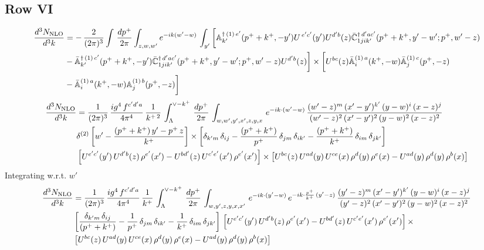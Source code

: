 \documentclass[9pt]{article}
\def\mf#1{\mathbb{#1}}
\numberwithin{equation}{section}
\begin{document}
\subsection{Row VI\,}
\begin{align}
     \frac{d^{3}N_{\rm NLO}}{d^{3}k} & =  -\, \frac{2}{(2\pi)^{3}} \int\, \frac{dp^{+}}{2\pi}\int_{z,w,w^{\prime}} e^{-ik(w^{\prime}-w)}\, \int_{y^{\prime}}\bigg[\mf{A}^{\dagger\, (1)\,e^{\prime}}_{k^{\prime}}(p^{+}+k^{+},-y^{\prime})U^{\, e^{\prime}c^{\prime}}(y^{\prime})U^{d^{\prime}b}(z) \Bar{\mf{C}}^{\dagger\, d^{\prime}ac^{\prime}}_{1jik^{\prime}}(p^{+}+k^{+},y^{\prime}-w^{\prime}; p^{+},w^{\prime}-z) \notag \\ & -\Bar{\mf{A}}^{\dagger\, (1)\,c^{\prime}}_{k^{\prime}}(p^{+}+k^{+},-y^{\prime})\Bar{\mf{C}}^{\dagger\, d^{\prime}ac^{\prime}}_{1jik^{\prime}}(p^{+}+k^{+},y^{\prime}-w^{\prime}; p^{+},w^{\prime}-z)U^{d^{\prime}b}(z)\bigg] \times \bigg[U^{bc}(z)\Bar{\mf{A}}^{(1)\, a}_{i}(k^{+},- w)\Bar{\mf{A}}^{(1)\, c}_{j}(p^{+},-z)\notag \\ & -\Bar{\mf{A}}^{(1)\, a}_{i}(k^{+},- w) \mf{A}^{(1)\, b}_{j}(p^{+},- z)\bigg]\nonumber
\end{align}
\begin{align}
     \frac{d^{3}N_{\rm NLO}}{d^{3}k} & =  \frac{1}{(2\pi)^{3}}\,\frac{ig^{4}\,f^{c'd'a}}{4\pi^{4}}\, \frac{1}{k^{+\,2}}\,\int_{\Lambda}^{\vee-k^{+}}\, \frac{dp^{+}}{2\pi}\, \int_{w,w',y',x',z,y,x}\, e^{-ik\cdot (w'-w)}\, \frac{(w'-z)^{m}\,(x'-y')^{k'}\,(y-w)^{i}\,(x-z)^{j}}{(w'-z)^{2}\,(x'-y')^{2}\,(y-w)^{2}\,(x-z)^{2}}\notag \\ & \delta^{(2)}\left[w'-\frac{(p^{+}+k^{+})\,y'-p^{+}\,z}{k^{+}}\right]\times \left[\delta_{k'm}\,\delta_{ij}-\frac{(p^{+}+k^{+})}{p^{+}}\,\delta_{jm}\,\delta_{ik'}-\frac{(p^{+}+k^{+})}{k^{+}}\, \delta_{im}\, \delta_{jk'}\right]\notag \\ & \left[U^{e'c'}(y')\,U^{d'b}(z)\,\rho^{e'}(x')-U^{bd'}(z)\,U^{c'e'}(x')\,\rho^{e'}(x')\right]\times \left[U^{bc}(z)\,U^{ad}(y)\,U^{ce}(x)\,\rho^{d}(y)\,\rho^{e}(x)-U^{ad}(y)\,\rho^{d}(y)\,\rho^{b}(x)\right]
\end{align}
Integrating w.r.t. $w'$
\begin{align}
     \frac{d^{3}N_{\rm NLO}}{d^{3}k} & = \frac{1}{(2\pi)^{3}}\, \frac{ig^{4}\,f^{c'd'a}}{4\pi^{4}}\, \frac{1}{k^{+}}\,\int_{\Lambda}^{\vee-k^{+}}\, \frac{dp^{+}}{2\pi}\, \int_{w,y',z,y,x,x'}\, e^{-ik\cdot (y'-w)}\, e^{-ik\cdot \frac{p^{+}}{k^{+}}\,(y'-z)}\,\frac{(y'-z)^{m}\,(x'-y')^{k'}\,(y-w)^{i}\,(x-z)^{j}}{(y'-z)^{2}\,(x'-y')^{2}\,(y-w)^{2}\,(x-z)^{2}}\notag \\ & \left[\frac{\delta_{k'm}\,\delta_{ij}}{(p^{+}+k^{+})}-\frac{1}{p^{+}}\,\delta_{jm}\,\delta_{ik'}-\frac{1}{k^{+}}\, \delta_{im}\, \delta_{jk'}\right]\, \left[U^{e'c'}(y')\,U^{d'b}(z)\,\rho^{e'}(x')-U^{bd'}(z)\,U^{c'e'}(x')\,\rho^{e'}(x')\right]\times\notag \\ &  \left[U^{bc}(z)\,U^{ad}(y)\,U^{ce}(x)\,\rho^{d}(y)\,\rho^{e}(x)-U^{ad}(y)\,\rho^{d}(y)\,\rho^{b}(x)\right]
\end{align}
\end{document}
